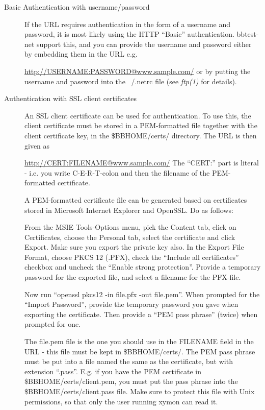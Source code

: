  \begin{description}
\item[Basic Authentication with username/password] If the URL requires
  authentication in the form of a username and password, it is most
  likely using the HTTP ``Basic'' authentication. bbtest-net support
  this, and you can provide the username and password either by
  embedding them in the URL e.g.  

 
\url{http://USERNAME:PASSWORD@www.sample.com/} 
 or by putting the username and password into the ~/.netrc file (see
 \emph{ftp(1)} for details). 


 

\item[Authentication with SSL client certificates] An SSL client
  certificate can be used for authentication. To use this, the client
  certificate must be stored in a PEM-formatted file together with the
  client certificate key, in the \$BBHOME/certs/ directory. The URL is
  then given as  

 
\url{http://CERT:FILENAME@www.sample.com/} 
 The ``CERT:'' part is literal - i.e. you write C-E-R-T-colon and then
 the filename of the PEM-formatted certificate.  

 A PEM-formatted certificate file can be generated based on
 certificates stored in Microsoft Internet Explorer and OpenSSL. Do as
 follows:  

 From the MSIE Tools-Options menu, pick the Content tab, click on
 Certificates, choose the Personal tab, select the certificate and
 click Export. Make sure you export the private key also. In the
 Export File Format, choose PKCS 12 (.PFX), check the ``Include all
 certificates'' checkbox and uncheck the ``Enable strong
 protection''. Provide a temporary password for the exported file, and
 select a filename for the PFX-file.  

 Now run ``openssl pkcs12 -in file.pfx -out file.pem''. When prompted
 for the ``Import Password'', provide the temporary password you gave
 when exporting the certificate. Then provide a ``PEM pass phrase''
 (twice) when prompted for one.  

 The file.pem file is the one you should use in the FILENAME field in
 the URL - this file must be kept in \$BBHOME/certs/. The PEM pass
 phrase must be put into a file named the same as the certificate, but
 with extension ``.pass''. E.g. if you have the PEM certificate in
 \$BBHOME/certs/client.pem, you must put the pass phrase into the
 \$BBHOME/certs/client.pass file. Make sure to protect this file with
 Unix permissions, so that only the user running xymon can read it. 


\end{description}
